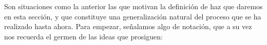 Son situaciones como la anterior las que motivan la definición de haz que daremos en esta sección, y que constituye una generalización natural del proceso que se ha realizado hasta ahora. Para empezar, señalamos algo de notación, que a su vez nos recuerda el germen de las ideas que prosiguen:
